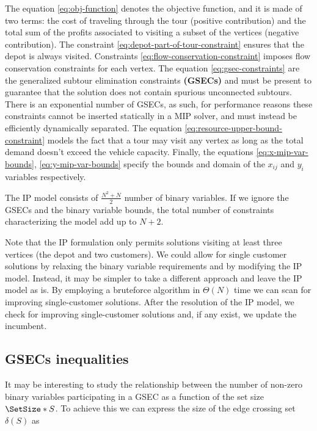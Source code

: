 The equation \eqref{eq:obj-function} denotes the objective function, and it is made of two terms: the cost of traveling through the tour (positive contribution) and the total sum of the profits associated to visiting a subset of the vertices (negative contribution).
The constraint \eqref{eq:depot-part-of-tour-constraint} ensures that the depot is always visited.
Constraints \eqref{eq:flow-conservation-constraint} imposes flow conservation constraints for each vertex.
The equation \eqref{eq:gsec-constraints} are the generalized subtour elimination constraints \textbf{(GSECs)} and must be present to guarantee that the solution does not contain spurious unconnected subtours.
There is an exponential number of GSECs, as such, for performance reasons these constraints cannot be inserted statically in a MIP solver, and must instead be efficiently dynamically separated.
The equation \eqref{eq:resource-upper-bound-constraint} models the fact that a tour may visit any vertex as long as the total demand doesn't exceed the vehicle capacity.
Finally, the equations \eqref{eq:x-mip-var-bounds}, \eqref{eq:y-mip-var-bounds} specify the bounds and domain of the $x_{ij}$ and $y_{i}$ variables respectively.

The IP model consists of $\frac{N^2 + N}{2}$ number of binary variables.
If we ignore the GSECs and the binary variable bounds, the total number of constraints characterizing the model add up to $N + 2$.

Note that the IP formulation only permits solutions visiting at least three vertices (the depot and two customers).
We could allow for single customer solutions by relaxing the binary variable requirements and by modifying the IP model.
Instead, it may be simpler to take a different approach and leave the IP model as is.
By employing a bruteforce algorithm in $\Theta(N)$ time we can scan for improving single-customer solutions.
After the resolution of the IP model, we check for improving single-customer solutions and, if any exist, we update the incumbent.

\subsection{GSECs inequalities}\label{sec:gsec-inequality}



It may be interesting to study the relationship between the number of non-zero binary variables participating in a GSEC as a function of the set size $\SetSize*{S}$.
To achieve this we can express the size of the edge crossing set $\delta(S)$ as

